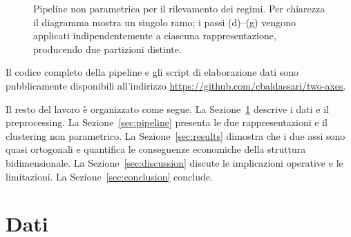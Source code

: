 \documentclass[12pt]{article}
\begin{document}
\begin{figure}[H]
{%
}
\caption{Pipeline non parametrica per il rilevamento dei regimi. Per chiarezza il diagramma mostra un singolo ramo; i passi (d)--(g) vengono applicati indipendentemente a ciascuna rappresentazione, producendo due partizioni distinte.}
\label{fig:pipeline}
\end{figure}

Il codice completo della pipeline e gli script di elaborazione dati sono pubblicamente disponibili all'indirizzo \url{https://github.com/cbaldassari/two-axes}.

Il resto del lavoro è organizzato come segue.
La Sezione~\ref{sec:data} descrive i dati e il preprocessing.
La Sezione~\ref{sec:pipeline} presenta le due rappresentazioni e il clustering non parametrico.
La Sezione~\ref{sec:results} dimostra che i due assi sono quasi ortogonali e quantifica le conseguenze economiche della struttura bidimensionale.
La Sezione~\ref{sec:discussion} discute le implicazioni operative e le limitazioni.
La Sezione~\ref{sec:conclusion} conclude.

\section{Dati}
\label{sec:data}
\end{document}
